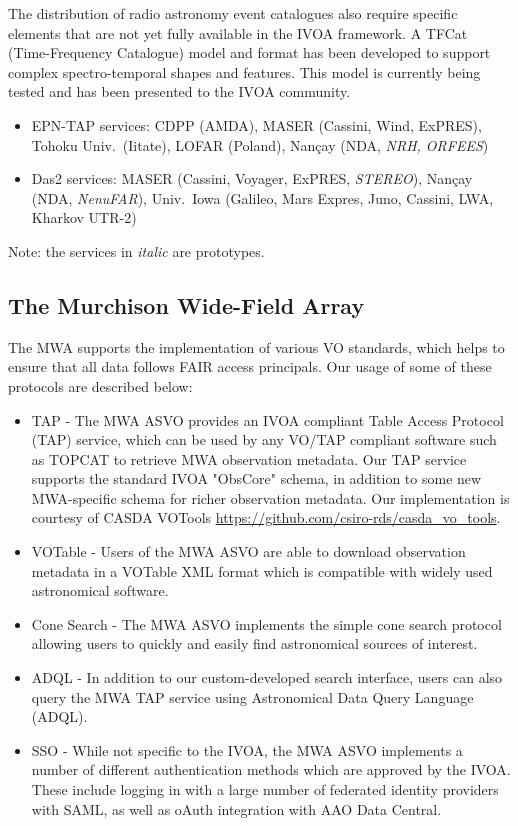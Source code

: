 \documentclass[11pt,a4paper]{ivoatex/ivoa}
\begin{document}
{The distribution of radio astronomy event catalogues also require specific elements that are not yet
fully available in the IVOA framework. A TFCat (Time-Frequency Catalogue) model and format has been 
developed to support complex spectro-temporal shapes and features. This model is currently being 
tested and has been presented to the IVOA community. 

\begin{itemize}
\item EPN-TAP services: CDPP (AMDA), MASER (Cassini, Wind, ExPRES), Tohoku Univ.\ (Iitate), LOFAR 
(Poland), Nan\c cay (NDA, \emph{NRH, ORFEES})
\item Das2 services: MASER (Cassini, Voyager, ExPRES, \emph{STEREO}), Nan\c cay (NDA, \emph{NenuFAR}), 
Univ.\ Iowa (Galileo, Mars Expres, Juno, Cassini, LWA, Kharkov UTR-2)
\end{itemize}
Note: the services in \emph{italic} are prototypes.

\subsection{The Murchison Wide-Field Array}
\label{sec:MWA}
The MWA supports the implementation of various VO standards, which helps to ensure that all data follows 
FAIR access principals. Our usage of some of these protocols are described below:
\begin{itemize}
\item TAP - The MWA ASVO provides an IVOA compliant Table Access Protocol (TAP) service, which can be 
used by any VO/TAP compliant software such as TOPCAT to retrieve MWA observation metadata. Our TAP 
service supports the standard IVOA "ObsCore" schema, in addition to some new MWA-specific schema for 
richer observation metadata. Our implementation is courtesy of CASDA VOTools 
\url{https://github.com/csiro-rds/casda_vo_tools}.
\item VOTable - Users of the MWA ASVO are able to download observation metadata in a VOTable XML format 
which is compatible with widely used astronomical software.
\item Cone Search - The MWA ASVO implements the simple cone search protocol allowing users to quickly
and easily find astronomical sources of interest.
\item ADQL - In addition to our custom-developed search interface, users can also query the MWA TAP
service using Astronomical Data Query Language (ADQL).
\item SSO - While not specific to the IVOA, the MWA ASVO implements a number of different authentication 
methods which are approved by the IVOA. These include logging in with a large number of federated 
identity providers with SAML, as well as oAuth integration with AAO Data Central.
\end{itemize}


}
\end{document}
